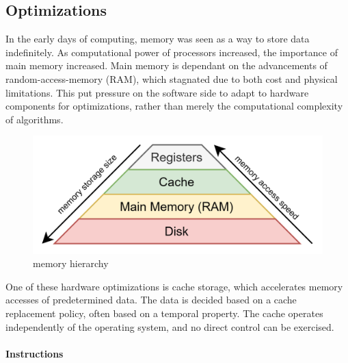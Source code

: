 \documentclass{article}
\begin{document}
\subsection{Optimizations}

In the early days of computing, memory was seen as a way to store data indefinitely.
As computational power of processors increased, the importance of main memory increased.
Main memory is dependant on the advancements of random-access-memory (RAM), which stagnated due to both cost and physical limitations\cite{memory}. 
This put pressure on the software side to adapt to hardware components for optimizations, rather than merely the computational complexity of algorithms.

\begin{figure}[ht]
    \centering
    \includegraphics[scale=0.2]{memoryhierarchy}
    \caption{ memory hierarchy }
\end{figure}

One of these hardware optimizations is cache storage, which accelerates memory accesses of predetermined data.
The data is decided based on a cache replacement policy, often based on a temporal property. 
The cache operates independently of the operating system\cite{memory}, and no direct control can be exercised.

\paragraph{Instructions}
\end{document}
